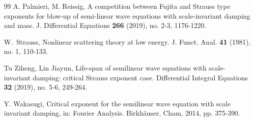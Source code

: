 \documentclass[11pt,twoside]{article}
\theoremstyle{plain}
\theoremstyle{definition}
\theoremstyle{remark}
\numberwithin{equation}{section}
\begin{document}
\begin{thebibliography}{99}
A. Palmieri, M. Reissig, A competition between Fujita and Strauss type exponents for blow-up of semi-linear wave
equations with scale-invariant damping and mass. J. Differential Equations \textbf{266} (2019),  no. 2-3, 1176-1220.

 W.~Strauss, Nonlinear scattering theory at
low energy. J. Funct. Anal. \textbf{41} (1981),  no. 1, 110-133.




 Tu Ziheng, Lin Jiayun, Life-span of semilinear wave equations with scale-invariant damping: critical Strauss exponent case.
Differential Integral Equations \textbf{32} (2019), no. 5-6, 249-264.


Y. Wakasugi, Critical exponent for the semilinear wave equation with scale invariant damping, in: Fourier Analysis.
Birkh\"auser, Cham, 2014, pp. 375-390.



\end{thebibliography}




\end{document}
